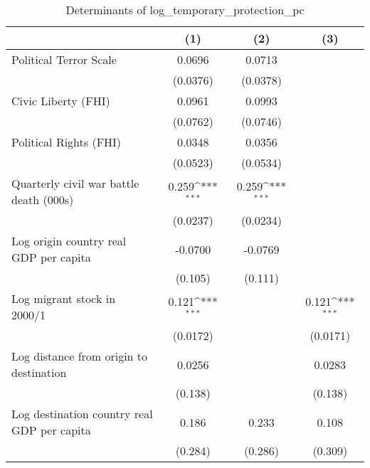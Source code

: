 \begin{table}[htbp]\centering
\def\sym#1{\ifmmode^{#1}\else\(^{#1}\)\fi}
\caption{Determinants of log\_temporary\_protection\_pc}
\begin{tabular}{l*{3}{c}}
\hline\hline
                    &\multicolumn{1}{c}{(1)}         &\multicolumn{1}{c}{(2)}         &\multicolumn{1}{c}{(3)}         \\
\hline
Political Terror Scale&      0.0696         &      0.0713         &                     \\
                    &    (0.0376)         &    (0.0378)         &                     \\
[1em]
Civic Liberty (FHI) &      0.0961         &      0.0993         &                     \\
                    &    (0.0762)         &    (0.0746)         &                     \\
[1em]
Political Rights (FHI)&      0.0348         &      0.0356         &                     \\
                    &    (0.0523)         &    (0.0534)         &                     \\
[1em]
Quarterly civil war battle death (000s)&       0.259\sym{***}&       0.259\sym{***}&                     \\
                    &    (0.0237)         &    (0.0234)         &                     \\
[1em]
Log origin country real GDP per capita&     -0.0700         &     -0.0769         &                     \\
                    &     (0.105)         &     (0.111)         &                     \\
[1em]
Log migrant stock in 2000/1&       0.121\sym{***}&                     &       0.121\sym{***}\\
                    &    (0.0172)         &                     &    (0.0171)         \\
[1em]
Log distance from origin to destination&      0.0256         &                     &      0.0283         \\
                    &     (0.138)         &                     &     (0.138)         \\
[1em]
Log destination country real GDP per capita&       0.186         &       0.233         &       0.108         \\
                    &     (0.284)         &     (0.286)         &     (0.309)         \\

\end{tabular}
\end{table}
